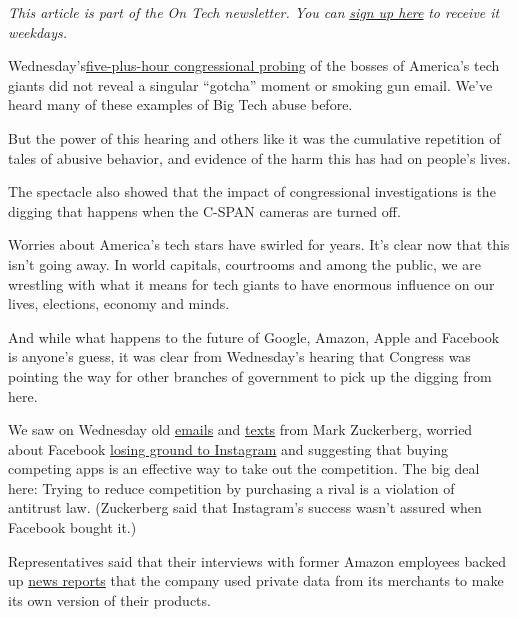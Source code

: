 \emph{This article is part of the On Tech newsletter. You can}
\href{https://www.nytimes.com/newsletters/signup/OT}{\emph{sign up
here}} \emph{to receive it weekdays.}

Wednesday's\href{https://www.nytimes.com/2020/07/29/technology/big-tech-hearing-apple-amazon-facebook-google.html}{five-plus-hour
congressional probing} of the bosses of America's tech giants did not
reveal a singular ``gotcha'' moment or smoking gun email. We've heard
many of these examples of Big Tech abuse before.

But the power of this hearing and others like it was the cumulative
repetition of tales of abusive behavior, and evidence of the harm this
has had on people's lives.

The spectacle also showed that the impact of congressional
investigations is the digging that happens when the C-SPAN cameras are
turned off.

Worries about America's tech stars have swirled for years. It's clear
now that this isn't going away. In world capitals, courtrooms and among
the public, we are wrestling with what it means for tech giants to have
enormous influence on our lives, elections, economy and minds.

And while what happens to the future of Google, Amazon, Apple and
Facebook is anyone's guess, it was clear from Wednesday's hearing that
Congress was pointing the way for other branches of government to pick
up the digging from here.

We saw on Wednesday old
\href{https://judiciary.house.gov/uploadedfiles/0002.pdf}{emails} and
\href{https://judiciary.house.gov/uploadedfiles/0006336700063372.pdf}{texts}
from Mark Zuckerberg, worried about Facebook
\href{https://www.nytimes.com/live/2020/07/29/technology/tech-ceos-hearing-testimony/lawmakers-said-documents-show-facebook-tried-to-neutralize-a-competitive-threat}{losing
ground to Instagram} and suggesting that buying competing apps is an
effective way to take out the competition. The big deal here: Trying to
reduce competition by purchasing a rival is a violation of antitrust
law. (Zuckerberg said that Instagram's success wasn't assured when
Facebook bought it.)

Representatives said that their interviews with former Amazon employees
backed up
\href{https://www.wsj.com/articles/amazon-scooped-up-data-from-its-own-sellers-to-launch-competing-products-11587650015}{news
reports} that the company used private data from its merchants to make
its own version of their products.


